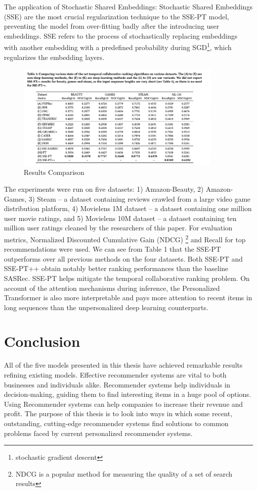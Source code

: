 The application of Stochastic Shared Embeddings: Stochastic Shared Embeddings (SSE) are the most crucial regularization technique to the SSE-PT model, preventing the model from over-fitting badly after the introducing user embeddings. SSE refers to the process of 
stochastically replacing embeddings with another embedding with
a predefined probability during SGD\footnote{stochastic gradient descent}, which regularizes the embedding layers. 
\begin{figure}[ht!]
    \centering
    \includegraphics[width=100mm]{results_Transformer.png}
    \caption{Results Comparison
    \label{overflow}}
\end{figure}
The experiments were run on five datasets: 1) Amazon-Beauty, 2) Amazon-Games, 3) Steam -- a dataset containing reviews crawled from a large video game distribution platform, 4) Movielens 1M dataset -- a dataset containing one million user movie ratings, and 5) Movielens 10M dataset -- a dataset containing ten million user ratings cleaned by the researchers of this paper. For evaluation metrics, Normalized Discounted Cumulative Gain (NDCG) \footnote{NDCG is a popular method for measuring the quality of a set of search results} and Recall for top recommendations were used.   We can see from Table 1 that the SSE-PT outperforms over all previous methods on the four datasets. Both SSE-PT and SSE-PT++ obtain notably better ranking performances than the baseline SASRec. SSE-PT helps mitigate the temporal collaborative ranking
problem. On account of the attention mechanisms
during inference, the Personalized Transformer is also more interpretable and pays more attention to recent items in long sequences than the unpersonalized deep learning counterparts.

\chapter{ Conclusion}

All of the five models presented in this thesis have achieved remarkable results refining existing models. Effective recommender systems are vital to both businesses and individuals alike. Recommender systems help individuals in decision-making, guiding them to find interesting items in a huge pool of options. Using Recommender systems can help companies to increase their revenue and profit. The purpose of this thesis is to look into ways in which some recent, outstanding, cutting-edge recommender systems find solutions to common problems faced by current personalized recommender systems.

